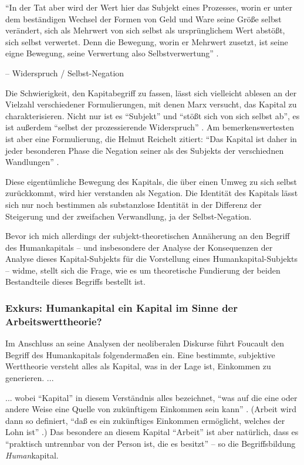 \documentclass[12pt,
               DIV13,
               paper=a4,
               twoside=false,
               onehalfspacing,
               bibliography=totoc,
               toc=graduated,
               draft,
               ]{scrartcl}
\newcommand{\pc}[2]{\parencite[#1]{#2}}
\newcommand{\zn}[3]{\parencite[#1, zit. nach][#2]{#3}}
\newcommand{\worries}[1]{\ifdraft{\textcolor{blue}{\texttt{(#1)}}}{}}
\begin{document}
"`In der Tat aber wird der Wert hier das Subjekt eines Prozesses,
worin er unter dem beständigen Wechsel der Formen von Geld und Ware
seine Größe selbst verändert, sich als Mehrwert von sich selbst als
ursprünglichem Wert abstößt, sich selbst verwertet. Denn die Bewegung,
worin er Mehrwert zusetzt, ist seine eigne Bewegung, seine Verwertung
also Selbstverwertung"' \pc{169}{kap}.

-- Widerspruch / Selbst-Negation

Die Schwierigkeit, den Kapitabegriff zu fassen, lässt sich vielleicht
ablesen an der Vielzahl verschiedener Formulierungen, mit denen Marx
versucht, das Kapital zu charakterisieren. Nicht nur ist es
"`Subjekt"' und "`stößt sich von sich selbst ab"', es ist außerdem
"`selbst der prozessierende Widerspruch"' \pc{601}{grundr}. Am
bemerkenswertesten ist aber eine Formulierung, die Helmut Reichelt
zitiert: "`Das Kapital ist daher in jeder besonderen Phase die
Negation seiner als des Subjekts der verschiednen Wandlungen"'
\zn{Marx}{181}{reichelt}.

Diese eigentümliche Bewegung des Kapitals, die über einen Umweg zu
sich selbst zurückkommt, wird hier verstanden als Negation. Die
Identität des Kapitals lässt sich nur noch bestimmen als substanzlose
Identität in der Differenz der Steigerung und der zweifachen
Verwandlung, ja der Selbst-Negation.


Bevor ich mich allerdings der subjekt-theoretischen Annäherung an den
Begriff des Humankapitals -- und insbesondere der Analyse der
Konsequenzen der Analyse dieses Kapital-Subjekts für die Vorstellung
eines Humankapital-Subjekts -- widme, stellt sich die Frage, wie es um
theoretische Fundierung der beiden Bestandteile dieses Begriffs
bestellt ist.

\subsubsection{Exkurs: Humankapital ein Kapital im Sinne der
Arbeitswerttheorie?}

Im Anschluss an seine Analysen der neoliberalen Diskurse führt
Foucault den Begriff des Humankapitals folgendermaßen ein. Eine
bestimmte, subjektive Werttheorie versteht alles als Kapital, was in der
Lage ist, Einkommen zu generieren. ... \worries{?}

... wobei "`Kapital"' in diesem Verständnis alles bezeichnet, "`was
auf die eine oder andere Weise eine Quelle von zukünftigem Einkommen
sein kann"' \pc{312}{gbp}. (Arbeit wird dann so definiert, "`daß es
ein zukünftiges Einkommen ermöglicht, welches der Lohn ist"'
\pc{312}{gbp}.) Das besondere an diesem Kapital "`Arbeit"' ist aber
natürlich, dass es "`praktisch untrennbar von der Person ist, die es
besitzt"' \pc{312}{gbp} -- so die Begriffsbildung \emph{Human}kapital.
\end{document}
